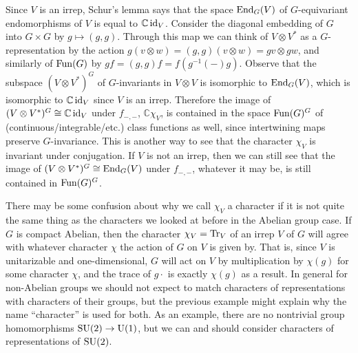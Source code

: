 \documentclass[../../rtnotes.tex]{subfiles}
\begin{document}
Since $V$ is an irrep, Schur's lemma says that the space $\operatorname{End}_G(V)$ of $G$-equivariant endomorphisms of $V$ is equal to $\mathbb C\operatorname{id}_V$. Consider the diagonal embedding of $G$ into $G\times G$ by $g\mapsto (g,g)$. Through this map we can think of $V\otimes V^\ast$ as a $G$-representation by the action $g(v\otimes w) = (g,g)(v\otimes w) = gv\otimes gw$, and similarly of $\operatorname{Fun}(G)$ by $gf = (g,g)f = f(g^{-1}(-)g)$. Observe that the subspace $(V\otimes V^\ast)^G$ of $G$-invariants in $V\otimes V$ is isomorphic to $\operatorname{End}_G(V)$, which is isomorphic to $\mathbb C\operatorname{id}_V$ since $V$ is an irrep. Therefore the image of $(V\otimes V^\ast)^G\cong \mathbb C\operatorname{id}_V$ under $f_{-,-}$, $\mathbb C\chi_V$, is contained in the space $\operatorname{Fun}(G)^G$ of (continuous/integrable/etc.) class functions as well, since intertwining maps preserve $G$-invariance. This is another way to see that the character $\chi_V$ is invariant under conjugation. If $V$ is not an irrep, then we can still see that the image of $(V\otimes V^\ast)^G\cong \operatorname{End}_G(V)$ under $f_{-,-}$, whatever it may be, is still contained in $\operatorname{Fun}(G)^G$.

There may be some confusion about why we call $\chi_V$ a character if it is not quite the same thing as the characters we looked at before in the Abelian group case. If $G$ is compact Abelian, then the character $\chi_V= \Tr_V$ of an irrep $V$ of $G$ will agree with whatever character $\chi$ the action of $G$ on $V$ is given by. That is, since $V$ is unitarizable and one-dimensional, $G$ will act on $V$ by multiplication by $\chi(g)$ for some character $\chi$, and the trace of $g\cdot$ is exactly $\chi(g)$ as a result. In general for non-Abelian groups we should not expect to match characters of representations with characters of their groups, but the previous example might explain why the name ``character'' is used for both. As an example, there are no nontrivial group homomorphisms $\operatorname{SU}(2)\to \operatorname{U}(1)$, but we can and should consider characters of representations of $\operatorname{SU}(2)$.
\end{document}
